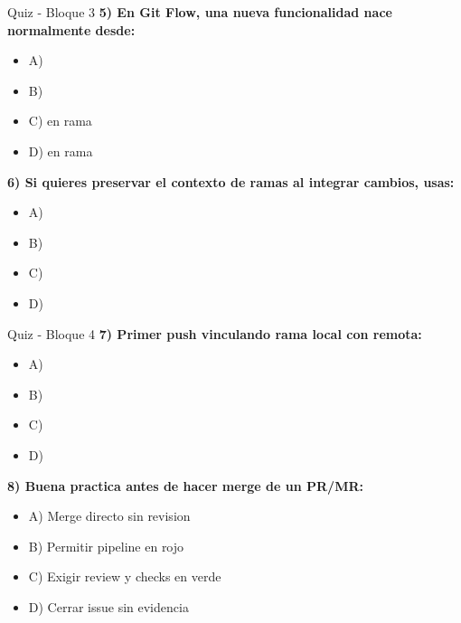 \documentclass[aspectratio=169]{beamer}
\begin{document}
\begin{frame}{Quiz - Bloque 3}
	\small
	\textbf{5) En Git Flow, una nueva funcionalidad nace normalmente desde:}
	\begin{itemize}
		\item A) 
		\item B) 
		\item C)  en rama 
		\item D)  en rama 
	\end{itemize}

	\textbf{6) Si quieres preservar el contexto de ramas al integrar cambios, usas:}
	\begin{itemize}
		\item A) 
		\item B) 
		\item C) 
		\item D) 
	\end{itemize}
\end{frame}

\begin{frame}{Quiz - Bloque 4}
	\small
	\textbf{7) Primer push vinculando rama local con remota:}
	\begin{itemize}
		\item A) 
		\item B) 
		\item C) 
		\item D) 
	\end{itemize}

	\textbf{8) Buena practica antes de hacer merge de un PR/MR:}
	\begin{itemize}
		\item A) Merge directo sin revision
		\item B) Permitir pipeline en rojo
		\item C) Exigir review y checks en verde
		\item D) Cerrar issue sin evidencia
	\end{itemize}
\end{frame}
\end{document}
